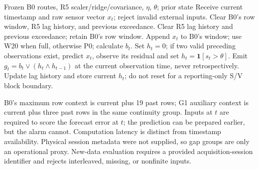 \documentclass{article}
\newcommand{\ind}{\mathbf{1}}
\begin{document}
\begin{algorithm}[h]
\caption{Selected G1 online update (complete finite inputs)}\label{alg:online}
\begin{algorithmic}[1]
\REQUIRE Frozen B0 routes, R5 scaler/ridge/covariance, $\eta$, $\theta$; prior state
\STATE Receive current timestamp and raw sensor vector $x_t$; reject invalid external inputs.
\STATE Clear B0's row window, R5 lag history, and previous exceedance.
\STATE Clear R5 lag history and previous exceedance; retain B0's row window.
\ENDIF
\STATE Append $x_t$ to B0's window; use W20 when full, otherwise P0; calculate $b_t$.
\STATE Set $h_t=0$; if two valid preceding observations exist, predict $x_t$, observe its residual and set $h_t=\ind[s_t>\theta]$.
\STATE Emit $g_t=b_t\lor(h_t\land h_{t-1})$ at the current observation time, never retrospectively.
\STATE Update lag history and store current $h_t$; do not reset for a reporting-only S/V block boundary.
\end{algorithmic}
\end{algorithm}

B0's maximum row context is current plus 19 past rows; G1 auxiliary context is current plus three past rows in the same continuity group. Inputs at $t$ are required to score the forecast error at $t$; the prediction can be prepared earlier, but the alarm cannot. Computation latency is distinct from timestamp availability. Physical session metadata were not supplied, so gap groups are only an operational proxy. New-data evaluation requires a provided acquisition-session identifier and rejects interleaved, missing, or nonfinite inputs.
\end{document}
